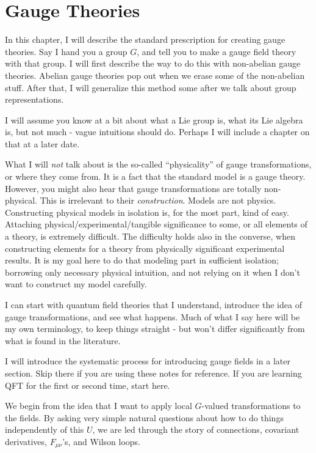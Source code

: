 \documentclass[main.tex]{subfiles}
\begin{document}
\chapter{Gauge Theories}
In this chapter, I will describe the standard prescription for creating gauge theories. Say I hand you a group $G$, and tell you to make a gauge field theory with that group. I will first describe the way to do this with non-abelian gauge theories. Abelian gauge theories pop out when we erase some of the non-abelian stuff. After that, I will generalize this method some after we talk about group representations.

I will assume you know at a bit about what a Lie group is, what its Lie algebra is, but not much - vague intuitions should do. Perhaps I will include a chapter on that at a later date.

What I will \textit{not} talk about is the so-called ``physicality'' of gauge transformations, or where they come from. It is a fact that the standard model is a gauge theory. However, you might also hear that gauge transformations are totally non-physical. This is irrelevant to their \textit{construction}. Models are not physics. Constructing physical models in isolation is, for the most part, kind of easy. Attaching physical/experimental/tangible significance to some, or all elements of a theory, is extremely difficult. The difficulty holds also in the converse, when constructing elements for a theory from physically significant experimental results. It is my goal here to do that modeling part in sufficient isolation; borrowing only necessary physical intuition, and not relying on it when I don't want to construct my model carefully.

I can start with quantum field theories that I understand, introduce the idea of gauge transformations, and see what happens. Much of what I say here will be my own terminology, to keep things straight - but won't differ significantly from what is found in the literature. 

I will introduce the systematic process for introducing gauge fields in a later section. Skip there if you are using these notes for reference. If you are learning QFT for the first or second time, start here. 

We begin from the idea that I want to apply local $G$-valued transformations to the fields. By asking very simple natural questions about how to do things independently of this $U$, we are led through the story of connections, covariant derivatives, $F_{\mu \nu}$'s, and Wilson loops. 
\end{document}
